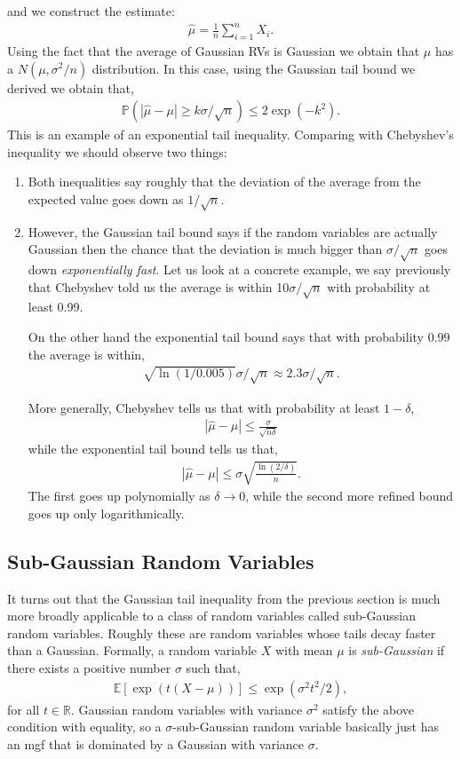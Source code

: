 \documentclass[twoside,12pt]{article}
\begin{document}
and we construct the estimate:
\begin{align*}
\widehat{\mu} = \frac{1}{n} \sum_{i=1}^n X_i.
\end{align*}
Using the fact that the average of Gaussian RVs is Gaussian we obtain that
$\widehat{\mu}$ has a $N(\mu, \sigma^2/n)$ distribution. In this case, using the Gaussian tail bound we derived we obtain that,
\begin{align*}
\mathbb{P}( | \widehat{\mu} - \mu| \geq k \sigma/\sqrt{n}) \leq 2 \exp (-k^2).
\end{align*}
This is an example of an exponential tail inequality. 
Comparing with Chebyshev's inequality we should observe two things:
\begin{enumerate}
\item Both inequalities say roughly that the deviation of the average from the expected value goes down as $1/\sqrt{n}$. 
\item However, the Gaussian tail bound says if the random variables are actually Gaussian then the chance that the deviation is much bigger than $\sigma/\sqrt{n}$ goes down \emph{exponentially fast}.
Let us look at a concrete example, we say previously that Chebyshev told us the average is within 10$\sigma/\sqrt{n}$ with probability at least 0.99. 

On the other hand the exponential tail bound says that with probability $0.99$ the average is within,
\begin{align*}
\sqrt{\ln(1/0.005)} \sigma/\sqrt{n} \approx 2.3 \sigma/\sqrt{n}.
\end{align*} 

More generally, Chebyshev tells us that with probability at least $1 - \delta$,
\begin{align*}
|\widehat{\mu} - \mu| \leq \frac{\sigma}{\sqrt{n \delta}} 
\end{align*}
while the exponential tail bound tells us that,
\begin{align*}
|\widehat{\mu} - \mu| \leq \sigma \sqrt{\frac{\ln (2/\delta) }{n}}.
\end{align*}
The first goes up polynomially as $\delta \rightarrow 0$, while the second more refined bound goes up only logarithmically.
\end{enumerate}

\subsection{Sub-Gaussian Random Variables}
It turns out that the Gaussian tail inequality from the previous section is much more broadly applicable to a class of random variables called sub-Gaussian random variables. Roughly these are random variables whose tails decay faster than a Gaussian. Formally, a random variable $X$ with mean $\mu$ is \emph{sub-Gaussian} if there exists a positive number $\sigma$ such that,
\begin{align*}
\mathbb{E}[\exp(t(X - \mu))] \leq \exp (\sigma^2 t^2/2),
\end{align*}
for all $t \in \mathbb{R}$. Gaussian random variables with variance $\sigma^2$ satisfy the above condition with equality, so a $\sigma$-sub-Gaussian random variable basically just has an mgf that is dominated by a Gaussian with variance $\sigma$.
\end{document}
